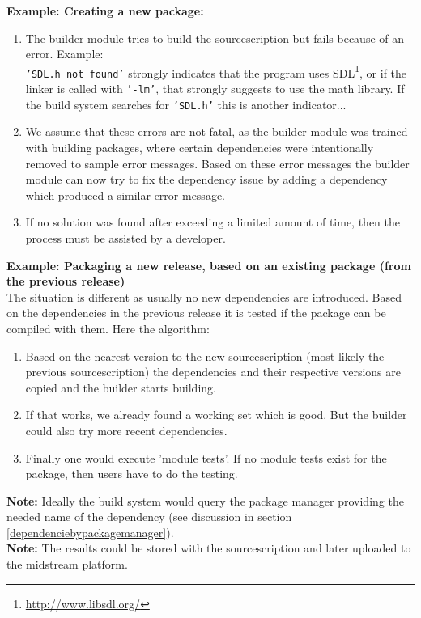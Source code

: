 \documentclass[a4paper,10pt]{article}
\begin{document}
\textbf{Example: Creating a new package:}
\begin{enumerate}
\item The builder module tries to build the sourcescription but fails because of an error. Example:\\ \texttt{'SDL.h not found'} strongly indicates that the program uses SDL\footnote{\url{http://www.libsdl.org/}}, or if the linker is called with \texttt{'-lm'}, that strongly suggests to use the math library. If the build system searches for \texttt{'SDL.h'} this is another indicator...
\item We assume that these errors are not fatal, as the builder module was trained with building packages, where certain dependencies were intentionally removed to sample error messages. Based on these error messages the builder module can now try to fix the dependency issue by adding a dependency which produced a similar error message.
\item If no solution was found after exceeding a limited amount of time, then the process must be assisted by a developer.
\end{enumerate}

\textbf{Example: Packaging a new release, based on an existing package (from the previous release)}\\
The situation is different as usually no new dependencies are introduced. Based on the dependencies in the previous release it is tested if the package can be compiled with them. Here the algorithm:
\begin{enumerate}
\item Based on the nearest version to the new sourcescription (most likely the previous sourcescription) the dependencies and their respective versions are copied and the builder starts building.
\item If that works, we already found a working set which is good. But the builder could also try more recent dependencies.
\item Finally one would execute 'module tests'. If no module tests exist for the package, then users have to do the testing.
\end{enumerate}

\textbf{Note:} Ideally the build system would query the package manager providing the needed name of the dependency (see discussion in section \ref{dependenciebypackagemanager}).\\

\textbf{Note:} The results could be stored with the sourcescription and later uploaded to the midstream platform.\\
\end{document}
